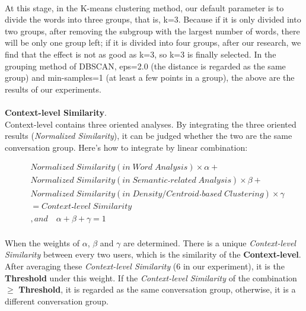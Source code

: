 \documentclass[a4paper,12pt]{report}
\begin{document}
\paragraph{}
At this stage, in the K-means clustering method, our default parameter is to divide the words into three groups, that is, k=3. Because if it is only divided into two groups, after removing the subgroup with the largest number of words, there will be only one group left; if it is divided into four groups, after our research, we find that the effect is not as good as k=3, so k=3 is finally selected. In the grouping method of DBSCAN, eps=2.0 (the distance is regarded as the same group) and min-samples=1 (at least a few points in a group), the above are the results of our experiments.
\\
\\
\textbf{Context-level Similarity}.\\
Context-level contains three oriented analyses. By integrating the three oriented results (\emph{Normalized Similarity}), it can be judged whether the two are the same conversation group. Here's how to integrate by linear combination:

\begin{equation*}%
\begin{split}
&Normalized\;Similarity(in\;Word\;Analysis)\times \alpha +\\
&Normalized\;Similarity(in\;Semantic\frac{\;}{\;}related\;Analysis)\times \beta +\\
&Normalized\;Similarity(in\;Density/Centroid\frac{\;}{\;}based\;Clustering )\times \gamma\\
&=Context\frac{\;}{\;}level\;Similarity\\
&,and\quad\alpha+ \beta+ \gamma=1
\end{split}
\end{equation*}
\\
When the weights of $\alpha$, $\beta$ and $\gamma$ are determined. There is a unique \emph{Context-level Similarity} between every two users, which is the similarity of the \textbf{Context-level}. After averaging these \emph{Context-level Similarity} (6 in our experiment), it is the \textbf{Threshold} under this weight. If the \emph{Context-level Similarity} of the combination $\geq$ \textbf{Threshold}, it is regarded as the same conversation group, otherwise, it is a different conversation group.
\end{document}
